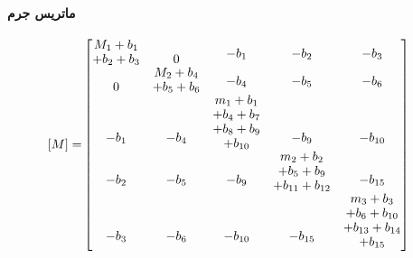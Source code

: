 \paragraph{ماتریس جرم}
\begin{equation}\label{Eq.mass_matrix_dimensional_combined}
\begin{aligned}
[M] =& 
\begin{bmatrix}
\shortstack[c]{$M_1 + b_1$ \\ $+ b_2 + b_3$} & 0 & \shortstack[c]{$-b_1$ \\ \,} & \shortstack[c]{$-b_2$ \\ \,} & \shortstack[c]{$-b_3$ \\ \,} \\
0 & \shortstack[c]{$M_2 + b_4$ \\ $+ b_5 + b_6$} & \shortstack[c]{$-b_4$ \\ \,} & \shortstack[c]{$-b_5$ \\ \,} & \shortstack[c]{$-b_6$ \\ \,} \\
\shortstack[c]{$-b_1$ \\ \,} & \shortstack[c]{$-b_4$ \\ \,} & \shortstack[c]{$m_1 + b_1$ \\ $+ b_4 + b_7$ \\ $+ b_8 + b_9$ \\ $+ b_{10}$} & \shortstack[c]{$-b_9$ \\ \,} & \shortstack[c]{$-b_{10}$ \\ \,} \\
\shortstack[c]{$-b_2$ \\ \,} & \shortstack[c]{$-b_5$ \\ \,} & \shortstack[c]{$-b_9$ \\ \,} & \shortstack[c]{$m_2 + b_2$ \\ $+ b_5 + b_9$ \\ $+ b_{11} + b_{12}$} & \shortstack[c]{$-b_{15}$ \\ \,} \\
\shortstack[c]{$-b_3$ \\ \,} & \shortstack[c]{$-b_6$ \\ \,} & \shortstack[c]{$-b_{10}$ \\ \,} & \shortstack[c]{$-b_{15}$ \\ \,} & \shortstack[c]{$m_3 + b_3$ \\ $+ b_6 + b_{10}$ \\ $+ b_{13} + b_{14}$ \\ $+ b_{15}$}
\end{bmatrix}
\end{aligned}
\end{equation}
 \noindent
